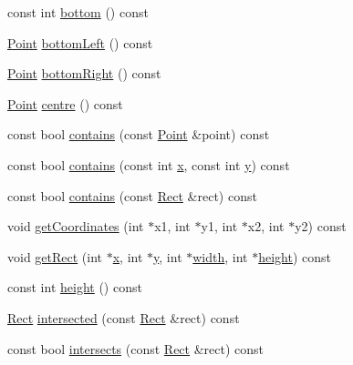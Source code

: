 \begin{DoxyCompactItemize}
\item 
const int \hyperlink{classprism_1_1_rect_a8a6f1fbe20a10549a5ab9b85e04f209c}{bottom} () const 
\item 
\hyperlink{classprism_1_1_point}{Point} \hyperlink{classprism_1_1_rect_a561c86db589efaafbca149cdc11c5759}{bottom\+Left} () const 
\item 
\hyperlink{classprism_1_1_point}{Point} \hyperlink{classprism_1_1_rect_a97eb5a66441a49c7e149229376aba6a0}{bottom\+Right} () const 
\item 
\hyperlink{classprism_1_1_point}{Point} \hyperlink{classprism_1_1_rect_aacf848f3301590ab85fd803d72301af7}{centre} () const 
\item 
const bool \hyperlink{classprism_1_1_rect_a85cd85c5299edb5cc07cda4cf7733256}{contains} (const \hyperlink{classprism_1_1_point}{Point} \&point) const 
\item 
const bool \hyperlink{classprism_1_1_rect_ab92f880c4cb90b1aa382d8217d19d391}{contains} (const int \hyperlink{classprism_1_1_rect_a202fa9a56964c9111a968fb9b420f5f4}{x}, const int \hyperlink{classprism_1_1_rect_a6e951744e0bba0fed781b86ab0be680b}{y}) const 
\item 
const bool \hyperlink{classprism_1_1_rect_a64af57e3a62339a8b1760b51d5a76809}{contains} (const \hyperlink{classprism_1_1_rect}{Rect} \&rect) const 
\item 
void \hyperlink{classprism_1_1_rect_a20e7825273f653914b1e3bc9954e7deb}{get\+Coordinates} (int $\ast$x1, int $\ast$y1, int $\ast$x2, int $\ast$y2) const 
\item 
void \hyperlink{classprism_1_1_rect_a24f54f589f54d555c623c3db8a169047}{get\+Rect} (int $\ast$\hyperlink{classprism_1_1_rect_a202fa9a56964c9111a968fb9b420f5f4}{x}, int $\ast$\hyperlink{classprism_1_1_rect_a6e951744e0bba0fed781b86ab0be680b}{y}, int $\ast$\hyperlink{classprism_1_1_rect_a8dae47a50fdac7a5f7e8aabef68437aa}{width}, int $\ast$\hyperlink{classprism_1_1_rect_ad713f4536accdc6d5d2e6a6d83eac78b}{height}) const 
\item 
const int \hyperlink{classprism_1_1_rect_ad713f4536accdc6d5d2e6a6d83eac78b}{height} () const 
\item 
\hyperlink{classprism_1_1_rect}{Rect} \hyperlink{classprism_1_1_rect_a25ab32467c418ae6ee84df7ae759851a}{intersected} (const \hyperlink{classprism_1_1_rect}{Rect} \&rect) const 
\item 
const bool \hyperlink{classprism_1_1_rect_a291145fd95310946e84a009646d1540a}{intersects} (const \hyperlink{classprism_1_1_rect}{Rect} \&rect) const 
\item 

\end{DoxyCompactItemize}
